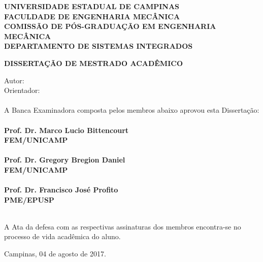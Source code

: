 \setcounter{page}{2}

\imprimirfolhaderosto*

 \begin{fichacatalografica}
    \centering
 \end{fichacatalografica}

\newpage
\begin{center}\large\textbf{UNIVERSIDADE ESTADUAL DE CAMPINAS \\
		FACULDADE DE ENGENHARIA MECÂNICA \\
		COMISSÃO DE PÓS-GRADUAÇÃO EM ENGENHARIA MECÂNICA \\
		DEPARTAMENTO DE SISTEMAS INTEGRADOS
		}\end{center}	
\vspace{0cm}	
\begin{center}\textbf{DISSERTAÇÃO DE MESTRADO ACADÊMICO}\end{center}
\vspace*{0cm}
\begin{center}
	\Huge\textbf{\imprimirtitulo}
\end{center}
\begin{flushleft}
Autor: \imprimirautor 
\\
Orientador: \imprimirorientador \\
\hfil \\
A Banca Examinadora composta pelos membros abaixo aprovou esta Dissertação:
\\ \hfil \\
\textbf{Prof. Dr. Marco Lucio Bittencourt \\
FEM/UNICAMP \\
\hfil \\
Prof. Dr. Gregory Bregion Daniel  \\
FEM/UNICAMP \\
\hfil \\
Prof. Dr. Francisco José Profito  \\
PME/EPUSP}

\hfil \\
A Ata da defesa com as respectivas assinaturas dos membros encontra-se no processo de vida acadêmica do aluno.
\end{flushleft}
\vspace{0.2cm} 
\begin{flushright}
	Campinas, 04 de agosto de 2017.
\end{flushright}
\newpage

